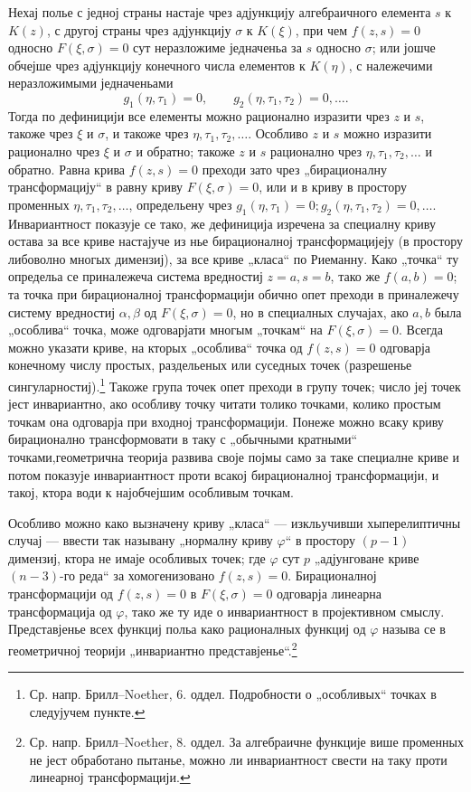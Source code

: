 ﻿\documentclass[11pt]{article}
\begin{document}
Нехај полье с једној страны настаје чрез адјункцију алгебраичного елемента \(s\) к \(K(z)\), с другој страны чрез адјункцију \(\sigma\) к \(K(\xi)\), при чем \(f(z,s)=0\) односно \(F(\xi,\sigma)=0\) сут неразложиме једначеньа за \(s\) односно \(\sigma\); или јошче обчејше чрез адјункцију конечного числа елементов к \(K(\eta)\), с належечими неразложимыми једначеньами
\[
g_1(\eta,\tau_1)=0,\qquad g_2(\eta,\tau_1,\tau_2)=0,\ldots .
\]
Тогда по дефиницији все елементы можно рационално изразити чрез \(z\) и \(s\), такоже чрез \(\xi\) и \(\sigma\), и такоже чрез \(\eta,\tau_1,\tau_2,\ldots\). Особливо \(z\) и \(s\) можно изразити рационално чрез \(\xi\) и \(\sigma\) и обратно; такоже \(z\) и \(s\) рационално чрез \(\eta,\tau_1,\tau_2,\ldots\) и обратно. Равна крива \(f(z,s)=0\) преходи зато чрез „бирационалну трансформацију“ в равну криву \(F(\xi,\sigma)=0\), или и в криву в простору променных \(\eta,\tau_1,\tau_2,\ldots\), определьену чрез \(g_1(\eta,\tau_1)=0; g_2(\eta,\tau_1,\tau_2)=0,\ldots\). Инвариантност показује се тако, же дефиниција изречена за специалну криву остава за все криве настајуче из нье бирационалној трансформацијеју (в простору либоволно многых димензиј), за все криве „класа“ по Риеманну. Како „точка“ ту определьа се приналежеча система вредностиј \(z=a,s=b\), тако же \(f(a,b)=0\); та точка при бирационалној трансформацији обично опет преходи в приналежечу систему вредностиј \(\alpha,\beta\) од \(F(\xi,\sigma)=0\), но в специалных случајах, ако \(a,b\) была „особлива“ точка, може одговарјати многым „точкам“ на \(F(\xi,\sigma)=0\). Всегда можно указати криве, на кторых „особлива“ точка од \(f(z,s)=0\) одговарја конечному числу простых, раздельеных или суседных точек (разрешенье сингуларностиј).\footnote{Ср. напр. Брилл--Noether, 6. оддел. Подробности о „особливых“ точках в следујучем пункте.} Такоже група точек опет преходи в групу точек; число јеј точек јест инвариантно, ако особливу точку читати толико точками, колико простым точкам она одговарја при входној трансформацији. Понеже можно всаку криву бирационално трансформовати в таку с „обычными кратными“ точками,\footnotemark[\value{footnote}] геометрична теорија развива своје појмы само за таке специалне криве и потом показује инвариантност проти всакој бирационалној трансформацији, и такој, ктора води к најобчејшим особливым точкам.

Особливо можно како вызначену криву „класа“ --- изкльучивши хыперелиптичны случај --- ввести так называну „нормалну криву \(\varphi\)“ в простору \((p-1)\) димензиј, ктора не имаје особливых точек; где \(\varphi\) сут \(p\) „адјунговане криве \((n-3)\)-го реда“ за хомогенизовано \(f(z,s)=0\). Бирационалној трансформацији од \(f(z,s)=0\) в \(F(\xi,\sigma)=0\) одговарја линеарна трансформација од \(\varphi\), тако же ту иде о инвариантност в пројективном смыслу. Представјенье всех функциј польа како рационалных функциј од \(\varphi\) называ се в геометричној теорији „инвариантно представјенье“.\footnote{Ср. напр. Брилл--Noether, 8. оддел. За алгебраичне функције више променных не јест обработано пытанье, можно ли инвариантност свести на таку проти линеарној трансформацији.}
\end{document}
